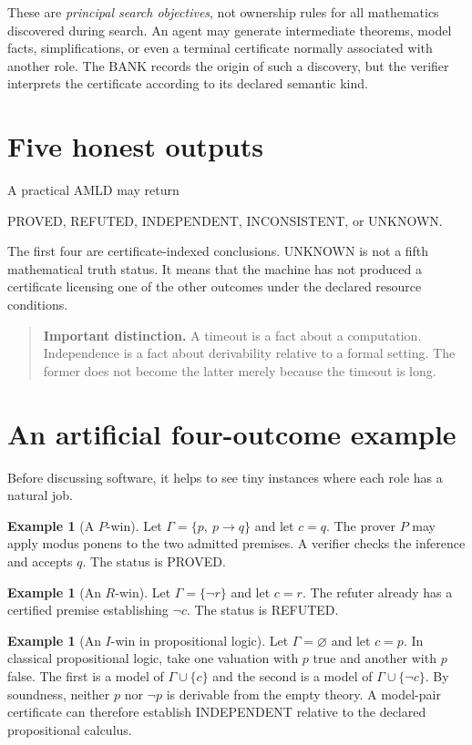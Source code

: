\documentclass[11pt,openany]{book}
\theoremstyle{definition}
\newtheorem{example}[theorem]{Example}
\theoremstyle{remark}
\newenvironment{warningbox}{\begin{quote}\small\color{red!50!black}\textbf{Important distinction.} }{\end{quote}}
\begin{document}
These are \emph{principal search objectives}, not ownership rules for all mathematics discovered during search. An agent may generate intermediate theorems, model facts, simplifications, or even a terminal certificate normally associated with another role. The BANK records the origin of such a discovery, but the verifier interprets the certificate according to its declared semantic kind.

\section{Five honest outputs}
A practical AMLD may return
\begin{center}
\textsf{PROVED}, \textsf{REFUTED}, \textsf{INDEPENDENT}, \textsf{INCONSISTENT}, or \textsf{UNKNOWN}.
\end{center}
The first four are certificate-indexed conclusions. \textsf{UNKNOWN} is not a fifth mathematical truth status. It means that the machine has not produced a certificate licensing one of the other outcomes under the declared resource conditions.

\begin{warningbox}
A timeout is a fact about a computation. Independence is a fact about derivability relative to a formal setting. The former does not become the latter merely because the timeout is long.
\end{warningbox}

\section{An artificial four-outcome example}
Before discussing software, it helps to see tiny instances where each role has a natural job.

\begin{example}[A $P$-win]
Let $\Gamma=\{p,\ p\to q\}$ and let $c=q$. The prover $P$ may apply modus ponens to the two admitted premises. A verifier checks the inference and accepts $q$. The status is \textsf{PROVED}.
\end{example}

\begin{example}[An $R$-win]
Let $\Gamma=\{\neg r\}$ and let $c=r$. The refuter already has a certified premise establishing $\neg c$. The status is \textsf{REFUTED}.
\end{example}

\begin{example}[An $I$-win in propositional logic]
Let $\Gamma=\varnothing$ and let $c=p$. In classical propositional logic, take one valuation with $p$ true and another with $p$ false. The first is a model of $\Gamma\cup\{c\}$ and the second is a model of $\Gamma\cup\{\neg c\}$. By soundness, neither $p$ nor $\neg p$ is derivable from the empty theory. A model-pair certificate can therefore establish \textsf{INDEPENDENT} relative to the declared propositional calculus.
\end{example}
\end{document}

